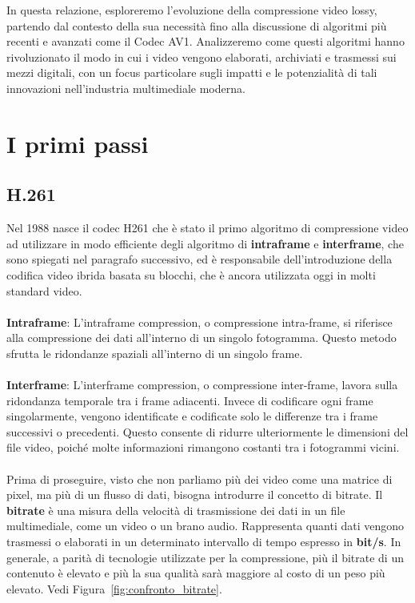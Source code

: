 \documentclass[a4paper,12pt, oneside]{article}
\begin{document}
In questa relazione, esploreremo l'evoluzione della compressione video lossy, partendo dal
contesto della sua necessità fino alla discussione di algoritmi più recenti e avanzati come il
Codec AV1. Analizzeremo come questi algoritmi hanno rivoluzionato il modo in cui i video
vengono elaborati, archiviati e trasmessi sui mezzi digitali, con un focus particolare sugli
impatti e le potenzialità di tali innovazioni nell'industria multimediale moderna.

\section{I primi passi}
\subsection{H.261}
Nel 1988 nasce il codec H261 che è stato il primo algoritmo di compressione video ad utilizzare
in modo efficiente degli algoritmo di \textbf{intraframe} e \textbf{interframe}, che sono
spiegati nel paragrafo successivo, ed è responsabile dell'introduzione della codifica video
ibrida basata su blocchi, che è ancora utilizzata oggi in molti standard video.
\noindent
\\\\\textbf{Intraframe}: L'intraframe compression, o compressione intra-frame, si riferisce alla
compressione dei dati all'interno di un singolo fotogramma. Questo metodo sfrutta le ridondanze
spaziali all'interno di un singolo frame.
\\\\\textbf{Interframe}: L'interframe compression, o compressione inter-frame, lavora sulla
ridondanza temporale tra i frame adiacenti. Invece di codificare ogni frame singolarmente,
vengono identificate e codificate solo le differenze tra i frame successivi o precedenti.
Questo consente di ridurre ulteriormente le dimensioni del file video, poiché molte
informazioni rimangono costanti tra i fotogrammi vicini.
\noindent
\\\\Prima di proseguire, visto che non parliamo più dei video come una matrice di pixel, ma più di
un flusso di dati, bisogna introdurre il concetto di bitrate.
Il \textbf{bitrate} è una misura della velocità di trasmissione dei dati in un file multimediale,
come un video o un brano audio. Rappresenta quanti dati vengono trasmessi o elaborati in un
determinato intervallo di tempo espresso in \textbf{bit/s}. In generale, a parità di tecnologie
utilizzate per la compressione, più il bitrate di un contenuto è elevato e più la sua qualità
sarà maggiore al costo di un peso più elevato. Vedi Figura~\ref{fig:confronto_bitrate}.
\end{document}
